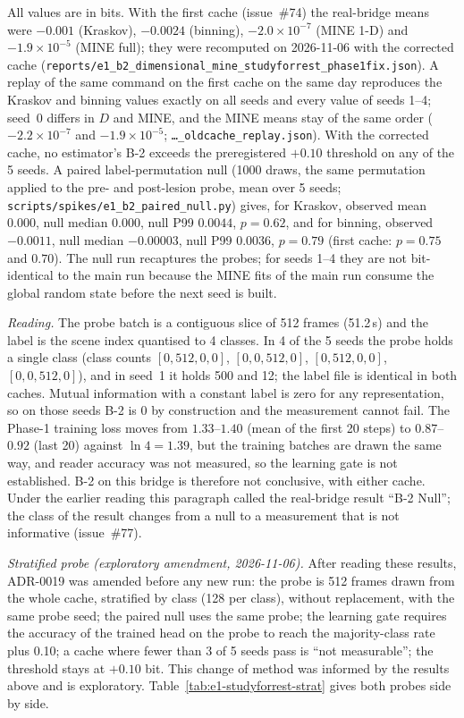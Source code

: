 \documentclass{article}
\begin{document}
All values are in bits. With the first cache (issue~\#74) the
real-bridge means were $-0.001$ (Kraskov), $-0.0024$ (binning),
$-2.0\times 10^{-7}$ (MINE 1-D) and $-1.9\times 10^{-5}$ (MINE full);
they were recomputed on 2026-11-06 with the corrected cache
(\texttt{reports/e1\_b2\_dimensional\_mine\_studyforrest\_phase1fix.json}).
A replay of the same command on the first cache on the same day
reproduces the Kraskov and binning values exactly on all seeds and
every value of seeds 1--4; seed~0 differs in $D$ and MINE, and the
MINE means stay of the same order ($-2.2\times 10^{-7}$ and
$-1.9\times 10^{-5}$; \texttt{\ldots\_oldcache\_replay.json}). With the corrected cache, no
estimator's B-2 exceeds the preregistered $+0.10$ threshold on any of
the 5 seeds. A paired label-permutation null (1000 draws, the same
permutation applied to the pre- and post-lesion probe, mean over 5
seeds; \texttt{scripts/spikes/e1\_b2\_paired\_null.py}) gives, for
Kraskov, observed mean $0.000$, null median $0.000$, null P99
$0.0044$, $p = 0.62$, and for binning, observed $-0.0011$, null median
$-0.00003$, null P99 $0.0036$, $p = 0.79$ (first cache: $p = 0.75$ and
$0.70$). The null run recaptures the probes; for seeds 1--4 they are
not bit-identical to the main run because the MINE fits of the main
run consume the global random state before the next seed is built.

\emph{Reading.} The probe batch is a contiguous slice of 512 frames
(51.2\,s) and the label is the scene index quantised to 4 classes. In
4 of the 5 seeds the probe holds a single class (class counts
$[0,512,0,0]$, $[0,0,512,0]$, $[0,512,0,0]$, $[0,0,512,0]$), and in
seed~1 it holds 500 and 12; the label file is identical in both
caches. Mutual information with a constant label is zero for any
representation, so on those seeds B-2 is $0$ by construction and the
measurement cannot fail. The Phase-1 training loss moves from
$1.33$--$1.40$ (mean of the first 20 steps) to $0.87$--$0.92$ (last
20) against
$\ln 4 = 1.39$, but the training batches are drawn the same way, and
reader accuracy was not measured, so the learning gate is not
established. B-2 on this bridge is therefore not conclusive, with
either cache. Under the earlier reading this paragraph called the
real-bridge result ``B-2 Null''; the class of the result changes
from a null to a measurement that is not informative (issue~\#77).

\emph{Stratified probe (exploratory amendment, 2026-11-06).} After
reading these results, ADR-0019 was amended before any new run: the
probe is 512 frames drawn from the whole cache, stratified by class
(128 per class), without replacement, with the same probe seed; the
paired null uses the same probe; the learning gate requires the
accuracy of the trained head on the probe to reach the majority-class
rate plus 0.10; a cache where fewer than 3 of 5 seeds pass is ``not
measurable''; the threshold stays at $+0.10$ bit. This change of
method was informed by the results above and is exploratory.
Table~\ref{tab:e1-studyforrest-strat} gives both probes side by side.
\end{document}
